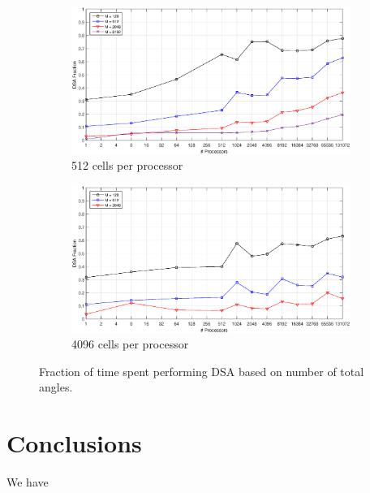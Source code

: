 \documentclass[preprint,review,12pt]{elsarticle}
\begin{document}
\begin{figure}
\centering
{
	\begin{subfigure}[b]{\textwidth}
		\centering
		\includegraphics[width=\textwidth]{figures/C512.eps}
		\caption{512 cells per processor}
	\end{subfigure}
}
	\vspace{1cm}
{
	\begin{subfigure}[b]{\textwidth}
		\centering
		\includegraphics[width=\textwidth]{figures/C4096.eps}
		\caption{4096 cells per processor}
	\end{subfigure}
}
\caption{Fraction of time spent performing DSA based on number of total angles.}
\label{fig::DSA_Scaling_DSAFrac}
\end{figure}

\section{Conclusions} \label{sec::conclusions}

We have 

\pagebreak



\end{document}
